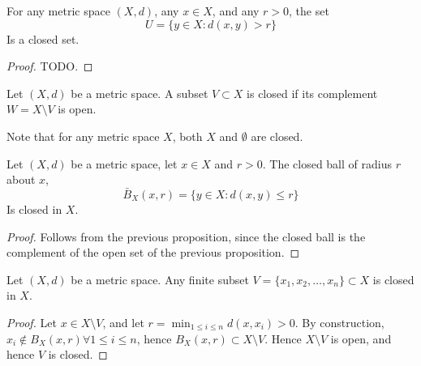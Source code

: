 \begin{proposition}
  For any metric space $(X,d)$, any $x\in X$, and any $r>0$, the set 
  \[U=\{y\in X : d(x,y)>r\}\]
  Is a closed set.
\end{proposition}
\begin{proof}
  TODO.
\end{proof}

\begin{definition}
  Let $(X,d)$ be a metric space. A subset $V\subset X$ is closed if its
  complement $W=X\setminus V$ is open.
\end{definition}
\begin{remark}
  Note that for any metric space $X$, both $X$ and $\emptyset$ are closed.
  \label{<+label+>}
\end{remark}

\begin{proposition}
  Let $(X,d)$ be a metric space, let $x\in X$ and $r>0$. The closed ball of
  radius $r$ about $x$,
  \[\bar{B}_X(x,r)= \{y\in X : d(x,y)\leq r\}\]
  Is closed in $X$.
\end{proposition}
\begin{proof}
  Follows from the previous proposition, since the closed ball is the complement
  of the open set of the previous proposition.
\end{proof}

\begin{proposition}
  Let $(X,d)$ be a metric space. Any finite subset $V=\{x_1,x_2,\dots,
  x_n\}\subset X$ is closed in $X$.
\end{proposition}
\begin{proof}
  Let $x\in X\setminus V$, and let $r=\min_{1\leq i\leq n} d(x,x_i)>0$. By
  construction, $x_i\not\in B_X(x,r) \forall 1\leq i \leq n$, hence
  $B_X(x,r)\subset X\setminus V$. Hence $X\setminus V$ is open, and hence $V$ is
  closed.
\end{proof}
